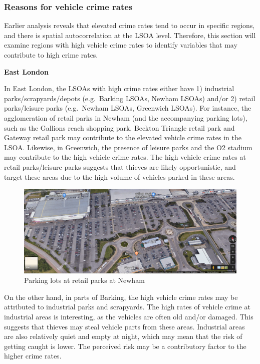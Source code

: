 \documentclass[]{article}
\theoremstyle{definition}
\theoremstyle{definition}
\theoremstyle{definition}
\theoremstyle{remark}
\begin{document}
\subsubsection{Reasons for vehicle crime
rates}\label{reasons-for-vehicle-crime-rates}

Earlier analysis reveals that elevated crime rates tend to occur in
specific regions, and there is spatial autocorrelation at the LSOA
level. Therefore, this section will examine regions with high vehicle
crime rates to identify variables that may contribute to high crime
rates.

\textbf{East London}

In East London, the LSOAs with high crime rates either have 1)
industrial parks/scrapyards/depots (e.g.~Barking LSOAs, Newham LSOAs)
and/or 2) retail parks/leisure parks (e.g.~Newham LSOAs, Greenwich
LSOAs). For instance, the agglomeration of retail parks in Newham (and
the accompanying parking lots), such as the Gallions reach shopping
park, Beckton Triangle retail park and Gateway retail park may
contribute to the elevated vehicle crime rates in the LSOA. Likewise, in
Greenwich, the presence of leisure parks and the O2 stadium may
contribute to the high vehicle crime rates. The high vehicle crime rates
at retail parks/leisure parks suggests that thieves are likely
opportunistic, and target these areas due to the high volume of vehicles
parked in these areas.

\begin{figure}
\centering
\includegraphics{pictures/Newhamshopping.png}
\caption{Parking lots at retail parks at Newham}
\end{figure}

On the other hand, in parts of Barking, the high vehicle crime rates may
be attributed to industrial parks and scrapyards. The high rates of
vehicle crime at industrial areas is interesting, as the vehicles are
often old and/or damaged. This suggests that thieves may steal vehicle
parts from these areas. Industrial areas are also relatively quiet and
empty at night, which may mean that the risk of getting caught is lower.
The perceived risk may be a contributory factor to the higher crime
rates.
\end{document}
